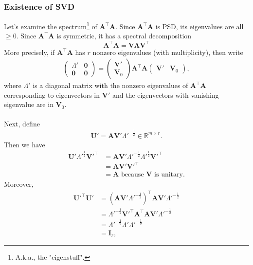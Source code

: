 \documentclass{article}
\begin{document}
\subsubsection*{Existence of SVD}
Let's examine the spectrum\footnote{A.k.a., the "eigenstuff".} of $\textbf{A}^\top\textbf{A}$. Since $\textbf{A}^\top\textbf{A}$ is PSD, its eigenvalues are all $\geq 0$. Since $\textbf{A}^\top\textbf{A}$ is symmetric, it has a spectral decomposition $$\mathbf{A^\top A= V\Lambda V^\top}$$ More precisely, if $\textbf{A}^\top\textbf{A}$ has $r$ nonzero eigenvalues (with multiplicity), then write
\begin{gather*}
    \begin{pmatrix}
    {\Lambda}' & \textbf{0} \\
    \textbf{0} & \textbf{0}
    \end{pmatrix}
    = \begin{pmatrix}
    \textbf{V}' \\
    \textbf{V}_0
    \end{pmatrix}
    \textbf{A}^\top\textbf{A}
    \begin{pmatrix}
    \textbf{V}' & \textbf{V}_0
    \end{pmatrix},
\end{gather*}
where $\Lambda'$ is a diagonal matrix with the nonzero eigenvalues of $\textbf{A}^\top\textbf{A}$ corresponding to eigenvectors in $\textbf{V}'$ and the eigenvectors with vanishing eigenvalue are in $\textbf{V}_0$. 
\\ \\
Next, define 
\begin{gather*}
    \textbf{U}' = \textbf{A}\textbf{V}'\Lambda'^{-\frac{1}{2}} \in \mathbb{R}^{m \times r}.
\end{gather*}
Then we have
\begin{align*}
    \textbf{U}'\Lambda'^{\frac{1}{2}}\textbf{V}'^\top &= \textbf{A}\textbf{V}'\Lambda'^{-\frac{1}{2}}\Lambda'^{\frac{1}{2}}\textbf{V}'^\top \\
    &= \textbf{A}\textbf{V}'\textbf{V}'^\top \\
    &= \textbf{A} \text{ because $\textbf{V}$ is unitary}.
\end{align*}
Moreover, 
\begin{align*}
    \textbf{U}'^\top\textbf{U}' &= (\textbf{A}\textbf{V}'\Lambda'^{-\frac{1}{2}})^\top \textbf{A}\textbf{V}'\Lambda'^{-\frac{1}{2}} \\
    &= \Lambda'^{-\frac{1}{2}}\textbf{V}'^\top\textbf{A}^\top \textbf{A}\textbf{V}'\Lambda'^{-\frac{1}{2}} \\
    &= \Lambda'^{-\frac{1}{2}}\Lambda'\Lambda'^{-\frac{1}{2}} \\
    &= \textbf{I}_r,
\end{align*}
\end{document}
